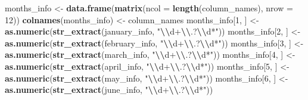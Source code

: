 \documentclass[
]{article}
\newenvironment{Shaded}{\begin{snugshade}}{\end{snugshade}}
\newcommand{\AttributeTok}[1]{\textcolor[rgb]{0.13,0.29,0.53}{#1}}
\newcommand{\DecValTok}[1]{\textcolor[rgb]{0.00,0.00,0.81}{#1}}
\newcommand{\FunctionTok}[1]{\textcolor[rgb]{0.13,0.29,0.53}{\textbf{#1}}}
\newcommand{\NormalTok}[1]{#1}
\newcommand{\OtherTok}[1]{\textcolor[rgb]{0.56,0.35,0.01}{#1}}
\newcommand{\SpecialCharTok}[1]{\textcolor[rgb]{0.81,0.36,0.00}{\textbf{#1}}}
\newcommand{\StringTok}[1]{\textcolor[rgb]{0.31,0.60,0.02}{#1}}
\begin{document}
\begin{Shaded}
\begin{Highlighting}[]
\NormalTok{months\_info }\OtherTok{\textless{}{-}} \FunctionTok{data.frame}\NormalTok{(}\FunctionTok{matrix}\NormalTok{(}\AttributeTok{ncol =} \FunctionTok{length}\NormalTok{(column\_names), }\AttributeTok{nrow =} \DecValTok{12}\NormalTok{))}
\FunctionTok{colnames}\NormalTok{(months\_info) }\OtherTok{\textless{}{-}}\NormalTok{ column\_names}
\NormalTok{months\_info[}\DecValTok{1}\NormalTok{, ] }\OtherTok{\textless{}{-}} \FunctionTok{as.numeric}\NormalTok{(}\FunctionTok{str\_extract}\NormalTok{(january\_info, }\StringTok{"}\SpecialCharTok{\textbackslash{}\textbackslash{}}\StringTok{d+}\SpecialCharTok{\textbackslash{}\textbackslash{}}\StringTok{.?}\SpecialCharTok{\textbackslash{}\textbackslash{}}\StringTok{d*"}\NormalTok{))}
\NormalTok{months\_info[}\DecValTok{2}\NormalTok{, ] }\OtherTok{\textless{}{-}} \FunctionTok{as.numeric}\NormalTok{(}\FunctionTok{str\_extract}\NormalTok{(february\_info, }\StringTok{"}\SpecialCharTok{\textbackslash{}\textbackslash{}}\StringTok{d+}\SpecialCharTok{\textbackslash{}\textbackslash{}}\StringTok{.?}\SpecialCharTok{\textbackslash{}\textbackslash{}}\StringTok{d*"}\NormalTok{))}
\NormalTok{months\_info[}\DecValTok{3}\NormalTok{, ] }\OtherTok{\textless{}{-}} \FunctionTok{as.numeric}\NormalTok{(}\FunctionTok{str\_extract}\NormalTok{(march\_info, }\StringTok{"}\SpecialCharTok{\textbackslash{}\textbackslash{}}\StringTok{d+}\SpecialCharTok{\textbackslash{}\textbackslash{}}\StringTok{.?}\SpecialCharTok{\textbackslash{}\textbackslash{}}\StringTok{d*"}\NormalTok{))}
\NormalTok{months\_info[}\DecValTok{4}\NormalTok{, ] }\OtherTok{\textless{}{-}} \FunctionTok{as.numeric}\NormalTok{(}\FunctionTok{str\_extract}\NormalTok{(april\_info, }\StringTok{"}\SpecialCharTok{\textbackslash{}\textbackslash{}}\StringTok{d+}\SpecialCharTok{\textbackslash{}\textbackslash{}}\StringTok{.?}\SpecialCharTok{\textbackslash{}\textbackslash{}}\StringTok{d*"}\NormalTok{))}
\NormalTok{months\_info[}\DecValTok{5}\NormalTok{, ] }\OtherTok{\textless{}{-}} \FunctionTok{as.numeric}\NormalTok{(}\FunctionTok{str\_extract}\NormalTok{(may\_info, }\StringTok{"}\SpecialCharTok{\textbackslash{}\textbackslash{}}\StringTok{d+}\SpecialCharTok{\textbackslash{}\textbackslash{}}\StringTok{.?}\SpecialCharTok{\textbackslash{}\textbackslash{}}\StringTok{d*"}\NormalTok{))}
\NormalTok{months\_info[}\DecValTok{6}\NormalTok{, ] }\OtherTok{\textless{}{-}} \FunctionTok{as.numeric}\NormalTok{(}\FunctionTok{str\_extract}\NormalTok{(june\_info, }\StringTok{"}\SpecialCharTok{\textbackslash{}\textbackslash{}}\StringTok{d+}\SpecialCharTok{\textbackslash{}\textbackslash{}}\StringTok{.?}\SpecialCharTok{\textbackslash{}\textbackslash{}}\StringTok{d*"}\NormalTok{))}

\end{Highlighting}
\end{Shaded}
\end{document}

